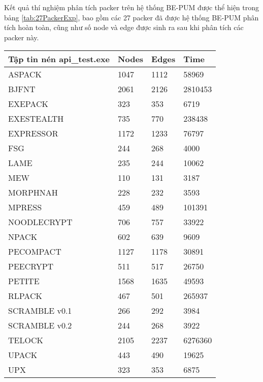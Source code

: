 \hspace{0.5cm}Kết quả thí nghiệm phân tích packer trên hệ thống BE-PUM được thể hiện trong bảng \ref {tab:27PackerExp}, bao gồm các 27 packer đã được hệ thống BE-PUM phân tích hoàn toàn, cũng như số node và edge được sinh ra sau khi phân tích các packer này.

\begin{small}
\setlength\tabcolsep{3pt}
\centering
\begin{longtable}{|l|l|l|l|}
\hline
\textbf{Tập tin nén api\_test.exe}	& \textbf{Nodes}	& \textbf{Edges}	& \textbf{Time}	\\
\hline 
ASPACK								& 1047				& 1112				& 58969 		\\
\hline 	
BJFNT								& 2061				& 2126				& 2810453		\\
\hline 
EXEPACK								& 323				& 353				& 6719			\\
\hline 
EXESTEALTH							& 735				& 770				& 238438		\\
\hline 
EXPRESSOR							& 1172				& 1233				& 76797			\\
\hline 
FSG									& 244				& 268				& 4000			\\
\hline 
LAME								& 235				& 244				& 10062			\\
\hline 
MEW									& 110				& 131				& 3187			\\
\hline 
MORPHNAH							& 228				& 232				& 3593			\\
\hline 
MPRESS								& 459				& 489				& 101391		\\
\hline 
NOODLECRYPT							& 706				& 757				& 33922			\\
\hline 
NPACK								& 602				& 639				& 9609			\\
\hline 
PECOMPACT							& 1127				& 1178				& 30891			\\
\hline 
PEECRYPT							& 511				& 517				& 26750			\\
\hline 
PETITE								& 1568				& 1635				& 49593			\\
\hline 
RLPACK								& 467				& 501				& 265937		\\
\hline 
SCRAMBLE v0.1						& 266				& 292				& 3984			\\
\hline 
SCRAMBLE v0.2						& 244				& 268				& 3922			\\
\hline 
TELOCK								& 2105				& 2237				& 6276360		\\
\hline 
UPACK								& 443				& 490				& 19625			\\
\hline 
UPX									& 323				& 353				& 6875			\\

\end{longtable}
\end{small}
